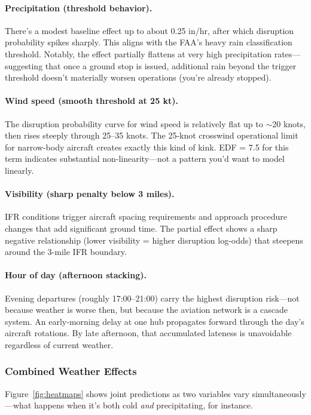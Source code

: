 \documentclass[12pt, a4paper]{article}
\begin{document}
\paragraph{Precipitation (threshold behavior).} There's a modest baseline effect up to about 0.25 in/hr, after which disruption probability spikes sharply. This aligns with the FAA's heavy rain classification threshold. Notably, the effect partially flattens at very high precipitation rates---suggesting that once a ground stop is issued, additional rain beyond the trigger threshold doesn't materially worsen operations (you're already stopped).

\paragraph{Wind speed (smooth threshold at 25 kt).} The disruption probability curve for wind speed is relatively flat up to $\sim$20 knots, then rises steeply through 25--35 knots. The 25-knot crosswind operational limit for narrow-body aircraft creates exactly this kind of kink. EDF = 7.5 for this term indicates substantial non-linearity---not a pattern you'd want to model linearly.

\paragraph{Visibility (sharp penalty below 3 miles).} IFR conditions trigger aircraft spacing requirements and approach procedure changes that add significant ground time. The partial effect shows a sharp negative relationship (lower visibility = higher disruption log-odds) that steepens around the 3-mile IFR boundary.

\paragraph{Hour of day (afternoon stacking).} Evening departures (roughly 17:00--21:00) carry the highest disruption risk---not because weather is worse then, but because the aviation network is a cascade system. An early-morning delay at one hub propagates forward through the day's aircraft rotations. By late afternoon, that accumulated lateness is unavoidable regardless of current weather.

\subsubsection{Combined Weather Effects}

Figure~\ref{fig:heatmaps} shows joint predictions as two variables vary simultaneously---what happens when it's both cold \textit{and} precipitating, for instance.
\end{document}
